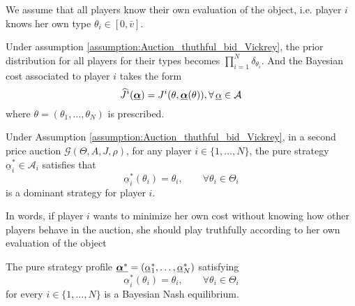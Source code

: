 \begin{assumption}
	We assume that all players know their own evaluation of the object, i.e. player $i$ knows her own type $\theta_i \in [0, \bar{v}]$. 
\label{assumption:Auction_thuthful_bid_Vickrey}
\end{assumption}

\begin{remark}
Under assumption \ref{assumption:Auction_thuthful_bid_Vickrey}, the prior distribution for all players for their types becomes $\prod_{i=1}^N \delta_{\theta_i}$. And the Bayesian cost associated to player $i$ takes the form
$$
	\widehat{J}^i(\underline{\boldsymbol{\alpha}}) = J^i(\theta, \underline{\boldsymbol{\alpha}}(\theta)), \forall \, \underline{\alpha} \in \mathcal{A}
$$
where $\theta = (\theta_1, \ldots, \theta_N)$ is prescribed.
\end{remark}

\begin{theorem}
	Under Assumption \ref{assumption:Auction_thuthful_bid_Vickrey}, in a second price auction $\mathcal{G}(\Theta, A,J, \rho)$, for any player $i\in\{1,\ldots,N\}$,  the pure strategy $\underline{\alpha}^*_i \in \mathcal{A}_i$ satisfies that
	$$
	\underline{\alpha}^*_i (\theta_i) = \theta_i, \qquad \forall \theta_i \in\Theta_i
	$$
	is a dominant strategy for player $i$. 
	
	In words, if player $i$ wants to minimize her own cost without knowing how other players behave in the auction, she should play truthfully according to her own evaluation of the object
	\label{theorem:Acution_truthful_bid_Vickrey_auction}
\end{theorem}

\begin{corollary}
	The pure strategy profile $\underline{\boldsymbol{\alpha}^*} = (\underline{\alpha}_1^*, \ldots, \underline{\alpha}_N^*)$ satisfying
	$$
	\underline{\alpha}^*_i (\theta_i) = \theta_i, \qquad \forall \theta_i \in\Theta_i	
	$$
	for every $i\in\{1,\ldots,N\}$ is a Bayesian Nash equilibrium.
\end{corollary}


